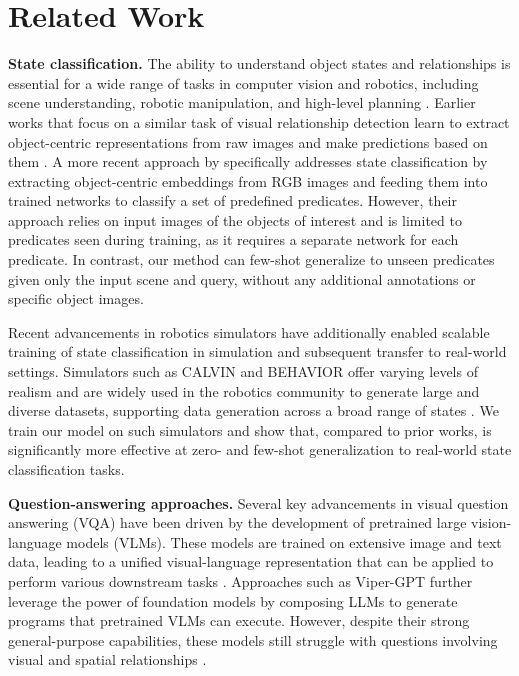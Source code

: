 \section{Related Work}
\vspace{-0.5cm}
\textbf{State classification.}
The ability to understand object states and relationships is essential for a wide range of tasks in computer vision and robotics, including scene understanding, robotic manipulation, and high-level planning \citep{yao2018visualrelationship, yuan2022sornet}. Earlier works that focus on a similar task of visual relationship detection learn to extract object-centric representations from raw images and make predictions based on them \citep{gkioxari2018detecting, yao2018visualrelationship, ma2022relvit, yuan2022sornet}. A more recent approach by \citet{yuan2022sornet} specifically addresses state classification by extracting object-centric embeddings from RGB images and feeding them into trained networks to classify a set of predefined predicates. However, their approach relies on input images of the objects of interest and is limited to predicates seen during training, as it requires a separate network for each predicate. In contrast, our method can few-shot generalize to unseen predicates given only the input scene and query, without any additional annotations or specific object images.

Recent advancements in robotics simulators have additionally enabled scalable training of state classification in simulation and subsequent transfer to real-world settings. Simulators such as CALVIN \citep{mees2022calvin} and BEHAVIOR \citep{li2023behavior} offer varying levels of realism and are widely used in the robotics community to generate large and diverse datasets, supporting data generation across a broad range of states \citep{ge2024behavior}. We train our model on such simulators and show that, compared to prior works, \model is significantly more effective at zero- and few-shot generalization to real-world state classification tasks.

\vspace{-0.1cm}
\textbf{Question-answering approaches.}
Several key advancements in visual question answering (VQA) have been driven by the development of pretrained large vision-language models (VLMs). These models are trained on extensive image and text data, leading to a unified visual-language representation that can be applied to perform various downstream tasks \citep{shen2021clip, li2023blip, gpt}. Approaches such as Viper-GPT \citep{suris2023vipergpt} further leverage the power of foundation models by composing LLMs to generate programs that pretrained VLMs can execute. However, despite their strong general-purpose capabilities, these models still struggle with questions involving visual and spatial relationships \citep{tong2024eyes}.

